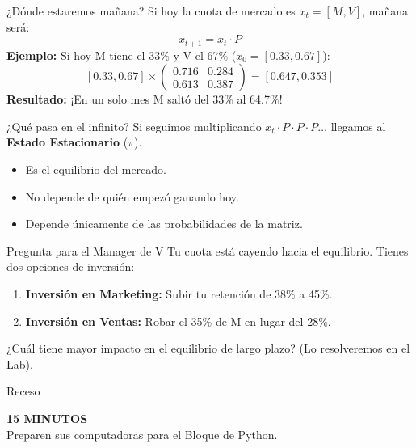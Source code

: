 \documentclass{beamer}
\begin{document}
\begin{frame}{¿Dónde estaremos mañana?}
Si hoy la cuota de mercado es $x_t = [M, V]$, mañana será:
\[ x_{t+1} = x_t \cdot P \]
\vspace{0.5cm}
\textbf{Ejemplo:}
Si hoy M tiene el 33\% y V el 67\% ($x_0 = [0.33, 0.67]$):
\[ [0.33, 0.67] \times \begin{pmatrix} 0.716 & 0.284 \\ 0.613 & 0.387 \end{pmatrix} = [0.647, 0.353] \]
\textbf{Resultado:} ¡En un solo mes M saltó del 33\% al 64.7\%!
\end{frame}

\begin{frame}{¿Qué pasa en el infinito?}
Si seguimos multiplicando $x_t \cdot P \cdot P \cdot P \dots$ llegamos al \textbf{Estado Estacionario} ($\pi$).
\begin{itemize}
    \item Es el equilibrio del mercado.
    \item No depende de quién empezó ganando hoy.
    \item Depende únicamente de las probabilidades de la matriz.
\end{itemize}
\end{frame}

\begin{frame}{Pregunta para el Manager de V}
Tu cuota está cayendo hacia el equilibrio. Tienes dos opciones de inversión:
\begin{enumerate}
    \item \textbf{Inversión en Marketing:} Subir tu retención de 38\% a 45\%.
    \item \textbf{Inversión en Ventas:} Robar el 35\% de M en lugar del 28\%.
\end{enumerate}
\vspace{0.3cm}
¿Cuál tiene mayor impacto en el equilibrio de largo plazo? (Lo resolveremos en el Lab).
\end{frame}

\begin{frame}{Receso}
\begin{center}
    \Huge \textbf{15 MINUTOS} \\
    \vspace{0.5cm}
    \large Preparen sus computadoras para el Bloque de Python.
\end{center}
\end{frame}
\end{document}
